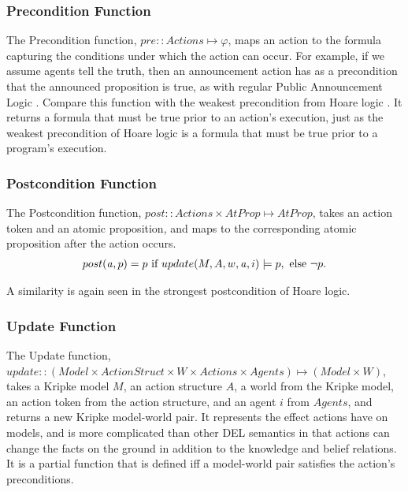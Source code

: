 \subsubsection{Precondition Function}
The Precondition function, $pre :: Actions \mapsto \varphi$, maps an action to the formula capturing the conditions under which the action can occur. For example, if we assume agents tell the truth, then an announcement action has as a precondition that the announced proposition is true, as with regular Public Announcement Logic \cite{PAL}. Compare this function with the weakest precondition from Hoare logic \cite{Hoare}. It returns a formula that must be true prior to an action's execution, just as the weakest precondition of Hoare logic is a formula that must be true prior to a program's execution. 



\subsubsection{Postcondition Function}
The Postcondition function, $post :: Actions \times AtProp \mapsto AtProp$, takes an action token and an atomic proposition, and maps to the corresponding atomic proposition after the action occurs.
\begin{align*}
post(\mathit{a},p)= p\ \mbox{if}\ update(M,A,w,\mathit{a},i)\models p,\  \mbox{else}\ {\neg} p.
\end{align*} 

A similarity is again seen in the strongest postcondition of Hoare logic.

\subsubsection{Update Function}
The Update function, $update :: (Model \times ActionStruct \times W \times Actions \times Agents) \mapsto (Model \times W)$, takes a Kripke model $M$, an action structure $A$, a world from the Kripke model, an action token from the action structure, and an agent $i$ from $Agents$, and returns a new Kripke model-world pair. It represents the effect actions have on models, and is more complicated than other DEL semantics in that actions can change the facts on the ground in addition to the knowledge and belief relations. It is a partial function that is defined iff a model-world pair satisfies the action's preconditions.
\\

